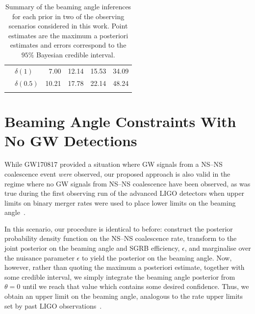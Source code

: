 \documentclass[twocolumn,nofootinbib]{revtex4-1}
\newcommand{\BNS}{\ac{NS}--\ac{NS}\xspace}
\begin{document}
\begin{table}
\begin{tabular}{llrrrr}
& $\delta(1)$ 	 & 7.00	 & 12.14	& 15.53	& 34.09	 \\
& $\delta(0.5)$ 	 & 10.21	 & 17.78	& 22.14	& 48.24	 \\
\botrule
\end{tabular}
\caption{Summary of the beaming angle inferences for each prior in two of the observing scenarios considered in this work.
    Point estimates are the maximum a posteriori estimates and errors correspond to the $95\%$ Bayesian credible interval.
    \label{tab:aligo_beam_inference}}
\end{table}

%

\section{Beaming Angle Constraints With No \ac{GW} Detections}
\label{sec:beaming_limits}
While GW170817 provided a situation where \ac{GW} signals from a \BNS
coalescence event \emph{were} observed, our proposed approach is also
valid in the regime where no \ac{GW} signals from \BNS coalescence
have been observed, as was true during the first observing run of the
advanced LIGO detectors when upper limits on binary merger rates were
used to place lower limits on the beaming angle~\cite{Abbott:2016ymx}.

In this scenario, our procedure is identical to before:
construct the posterior probability density function on the \BNS
coalescence rate, transform to the joint posterior on the beaming
angle and \ac{SGRB} efficiency, $\epsilon$, and marginalise over the
nuisance parameter $\epsilon$ to yield the posterior on the beaming
angle.  Now, however, rather than quoting the maximum a posteriori
estimate, together with some credible interval, we simply integrate
the beaming angle posterior from $\theta=0$ until we reach that value
which contains some desired confidence.  Thus, we obtain an upper
limit on the beaming angle, analogous to the rate upper limits set by
past LIGO observations~\cite{Colaboration:2011np}.
\end{document}
